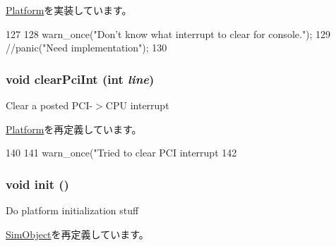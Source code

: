 \hyperlink{classPlatform_aaf1bfcf0f5ac95c6a9d1607172a5a29e}{Platform}を実装しています。


\begin{DoxyCode}
127 {
128     warn_once("Don't know what interrupt to clear for console.\n");
129     //panic("Need implementation\n");
130 }
\end{DoxyCode}
\hypertarget{classPc_a0d98ea2b236bb883fa15d63a59a2ec9e}{
\subsubsection[{clearPciInt}]{\setlength{\rightskip}{0pt plus 5cm}void clearPciInt (int {\em line})}}
\label{classPc_a0d98ea2b236bb883fa15d63a59a2ec9e}
Clear a posted PCI-\/$>$CPU interrupt 

\hyperlink{classPlatform_a0d98ea2b236bb883fa15d63a59a2ec9e}{Platform}を再定義しています。


\begin{DoxyCode}
140 {
141     warn_once("Tried to clear PCI interrupt %
142 }
\end{DoxyCode}
\hypertarget{classPc_a02fd73d861ef2e4aabb38c0c9ff82947}{
\subsubsection[{init}]{\setlength{\rightskip}{0pt plus 5cm}void init ()}}
\label{classPc_a02fd73d861ef2e4aabb38c0c9ff82947}
Do platform initialization stuff 

\hyperlink{classSimObject_a02fd73d861ef2e4aabb38c0c9ff82947}{SimObject}を再定義しています。


